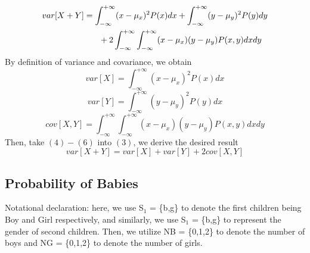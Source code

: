 \documentclass[11pt,a4paper]{article}
\newcommand{\htab}{\hspace*{0.63cm}}
\newcommand{\infint}{\int_{-\infty}^{+\infty}}
\newcommand{\dinfint}{\int_{-\infty}^{+\infty}\int_{-\infty}^{+\infty}}
\begin{document}
    \begin{equation}
    \begin{aligned}
    var[X+Y] & = \infint (x-\mu_{x})^{2} P(x) dx + \infint (y-\mu_{y})^{2} P(y) dy \\
               & \htab + 2\dinfint (x-\mu_{x})(y-\mu_{y}) P(x,y) dx dy \\
    \end{aligned} 
    \end{equation}
\htab By definition of variance and covariance, we obtain
    \begin{equation} var[X]= \infint (x-\mu_{x})^{2} P(x) dx  \end{equation}
    \begin{equation} var[Y]= \infint (y-\mu_{y})^{2} P(y) dx  \end{equation}
    \begin{equation} cov[X,Y]= \dinfint (x-\mu_{x})(y-\mu_{y}) P(x,y) dx dy  \end{equation}
\htab Then, take $(4)-(6)$ into $(3)$, we derive the desired result
    \begin{equation}
        var[X+Y] = var[X] + var[Y] + 2cov[X,Y]
    \end{equation}
\newpage
\subsection{Probability of Babies}
\htab Notational declaration: here, we use S$_{1}$ = \{b,g\} to denote the first children being Boy and Girl respectively, and similarly, we use S$_{1}$ = \{b,g\} to represent the gender of second children. Then, we utilize NB = \{0,1,2\} to denote the number of boys and NG = \{0,1,2\} to denote the number of girls.
\end{document}
